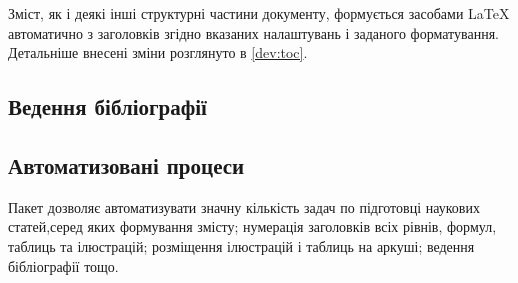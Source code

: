 Зміст, як і деякі інші структурні частини документу, формується засобами \LaTeX{} автоматично з заголовків згідно вказаних налаштувань і заданого форматування. Детальніше внесені зміни розглянуто в \ref{dev:toc}.

\subsection{Ведення бібліографії}



\subsection{Автоматизовані процеси}

Пакет дозволяє автоматизувати значну кількість задач по підготовці наукових статей,серед яких формування змісту; нумерація заголовків всіх рівнів, формул, таблиць та ілюстрацій; розміщення ілюстрацій і таблиць на аркуші; ведення бібліографії тощо.
